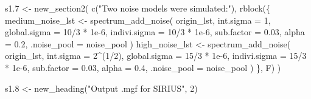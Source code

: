 \documentclass[
]{article}
\newenvironment{Shaded}{\begin{snugshade}}{\end{snugshade}}
\newcommand{\AttributeTok}[1]{\textcolor[rgb]{0.77,0.63,0.00}{#1}}
\newcommand{\DecValTok}[1]{\textcolor[rgb]{0.00,0.00,0.81}{#1}}
\newcommand{\FloatTok}[1]{\textcolor[rgb]{0.00,0.00,0.81}{#1}}
\newcommand{\FunctionTok}[1]{\textcolor[rgb]{0.00,0.00,0.00}{#1}}
\newcommand{\NormalTok}[1]{#1}
\newcommand{\OtherTok}[1]{\textcolor[rgb]{0.56,0.35,0.01}{#1}}
\newcommand{\SpecialCharTok}[1]{\textcolor[rgb]{0.00,0.00,0.00}{#1}}
\newcommand{\StringTok}[1]{\textcolor[rgb]{0.31,0.60,0.02}{#1}}
\begin{document}
\begin{Shaded}
\begin{Highlighting}[]
\NormalTok{s1}\FloatTok{.7} \OtherTok{\textless{}{-}} \FunctionTok{new\_section2}\NormalTok{(}
  \FunctionTok{c}\NormalTok{(}\StringTok{"Two noise models were simulated:"}\NormalTok{),}
  \FunctionTok{rblock}\NormalTok{(\{}
\NormalTok{    medium\_noise\_lst }\OtherTok{\textless{}{-}} \FunctionTok{spectrum\_add\_noise}\NormalTok{(}
\NormalTok{      origin\_lst,}
      \AttributeTok{int.sigma =} \DecValTok{1}\NormalTok{,}
      \AttributeTok{global.sigma =} \DecValTok{10}\SpecialCharTok{/}\DecValTok{3} \SpecialCharTok{*} \FloatTok{1e{-}6}\NormalTok{,}
      \AttributeTok{indivi.sigma =} \DecValTok{10}\SpecialCharTok{/}\DecValTok{3} \SpecialCharTok{*} \FloatTok{1e{-}6}\NormalTok{,}
      \AttributeTok{sub.factor =} \FloatTok{0.03}\NormalTok{,}
      \AttributeTok{alpha =} \FloatTok{0.2}\NormalTok{,}
      \AttributeTok{.noise\_pool =}\NormalTok{ noise\_pool}
\NormalTok{    )}
\NormalTok{    high\_noise\_lst }\OtherTok{\textless{}{-}} \FunctionTok{spectrum\_add\_noise}\NormalTok{(}
\NormalTok{      origin\_lst,}
      \AttributeTok{int.sigma =} \DecValTok{2}\SpecialCharTok{\^{}}\NormalTok{(}\DecValTok{1}\SpecialCharTok{/}\DecValTok{2}\NormalTok{),}
      \AttributeTok{global.sigma =} \DecValTok{15}\SpecialCharTok{/}\DecValTok{3} \SpecialCharTok{*} \FloatTok{1e{-}6}\NormalTok{,}
      \AttributeTok{indivi.sigma =} \DecValTok{15}\SpecialCharTok{/}\DecValTok{3} \SpecialCharTok{*} \FloatTok{1e{-}6}\NormalTok{,}
      \AttributeTok{sub.factor =} \FloatTok{0.03}\NormalTok{,}
      \AttributeTok{alpha =} \FloatTok{0.4}\NormalTok{,}
      \AttributeTok{.noise\_pool =}\NormalTok{ noise\_pool}
\NormalTok{    )}
\NormalTok{  \}, F)}
\NormalTok{)}

\NormalTok{s1}\FloatTok{.8} \OtherTok{\textless{}{-}} \FunctionTok{new\_heading}\NormalTok{(}\StringTok{"Output .mgf for SIRIUS"}\NormalTok{, }\DecValTok{2}\NormalTok{)}


\end{Highlighting}
\end{Shaded}
\end{document}
